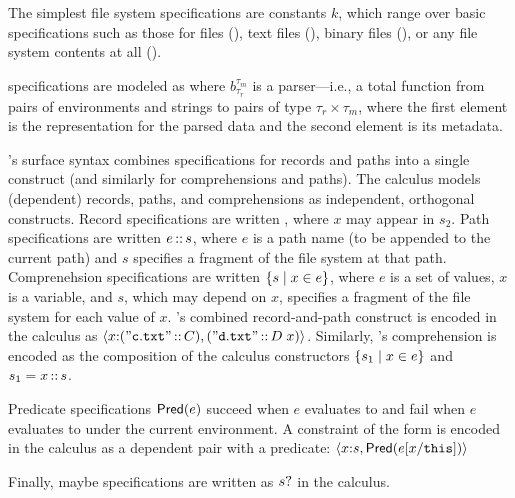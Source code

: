 The simplest file system specifications are constants $k$, which range
over basic specifications such as those for files (\pfile), text files
(\ptext), binary files (\pbin), or any file system contents at all
(\pany).

\padshaskell{} specifications are modeled as  where
$b^{\tau_m}_{\tau_r}$ is a parser---i.e., a total function from pairs
of environments and strings to pairs of type $\tau_r \times \tau_m$,
where the first element is the representation for the parsed data and
the second element is its metadata.

\forest{}'s surface syntax combines specifications for records and
paths into a single construct (and similarly for comprehensions and
paths). The calculus models (dependent) records, paths, and
comprehensions as independent, orthogonal constructs.  Record
specifications are written , where $x$ may appear
in $s_2$.  Path specifications are written $e\,{::}\,s$, where $e$
is a path name (to be appended to the current path) and $s$ specifies
a fragment of the file system at that path. Comprenehsion
specifications are written $\{ s \mid x \in e \}$, where $e$ is a set of
values, $x$ is a variable, and $s$, which may depend on $x$, specifies
a fragment of the file system for each value of $x$.
\forest{}'s combined record-and-path construct 
 is encoded in the calculus as
$\langle x {:} (\mathtt{"c.txt"}\,{::}\,C), (\mathtt{"d.txt"}\,{::}\,D\; x) \rangle$.  Similarly, \forest{}'s comprehension 
\cd{[x :: s | x <- e]} is encoded as the composition of the
calculus constructors $\{ s_1 \mid x \in e \}$ and $s_1 = x\,{::}\,s$.

Predicate specifications $\mathsf{Pred}(e)$ succeed when $e$ evaluates to
\True{} and fail when $e$ evaluates to \False under the current
environment.  A \forest{} constraint of the form  is
encoded in the calculus as a dependent pair with a predicate:
$\langle x {:} s, \mathsf{Pred}(e[x/\mathtt{this}]) \rangle$

Finally, maybe specifications are written as $s?$ in the
calculus.


